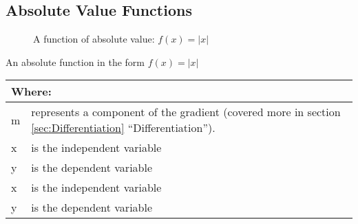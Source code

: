 \subsection{Absolute Value Functions}
\begin{figure}[!hbt]
\label{fig:FuncGraphAbsolute}
\caption{A function of absolute value: $f(x) = |x|$}
\end{figure}
An absolute function in the form $ f(x) = |x|$
\begin{table}[!hbt]
\label{tab:PartsOfAnAbsoluteFunction}
\begin{tabularx}{\linewidth}{| l X |}
  \hline
  \multicolumn{2}{|l|}{Where:} \\
  \hline \hline
  m & represents a component of the gradient (covered more in section
  \ref{sec:Differentiation} ``Differentiation''). \\ x & is the independent
  variable\\ y & is the dependent variable\\
  x & is the independent variable\\
  y & is the dependent variable\\
\hline
\end{tabularx}
\end{table}
\clearpage
%
\newpage
